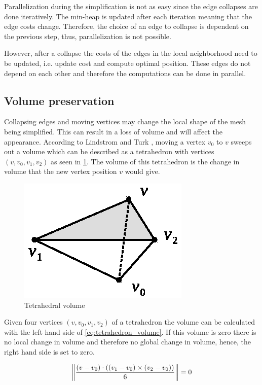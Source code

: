 Parallelization during the simplification is not as easy since the edge collapses are done iteratively. The min-heap is updated after each iteration meaning that the edge costs change. Therefore, the choice of an edge to collapse is dependent on the previous step, thus, parallelization is not possible.

However, after a collapse the costs of the edges in the local neighborhood need to be updated, i.e. update cost and compute optimal position. These edges do not depend on each other and therefore the computations can be done in parallel.

\subsection{Volume preservation} \label{sec:volume_preservation}
Collapsing edges and moving vertices may change the local shape of the mesh being simplified. This can result in a loss of volume and will affect the appearance. According to Lindstrom and Turk \cite{lindstrom1998fast} , moving a vertex $v_0$ to $v$ sweeps out a volume which can be described as a tetrahedron with vertices $(v, v_0, v_1, v_2)$ as seen in \cref{fig:tetrahedron}. The volume of this tetrahedron is the change in volume that the new vertex position $v$ would give. 

\begin{figure}[h]
    \centering
    \includegraphics[width=.5\textwidth]{figures/tetrahedron.eps}
    \caption{Tetrahedral volume}
    \label{fig:tetrahedron}
\end{figure}

Given four vertices $(v, v_0, v_1, v_2)$ of a tetrahedron the volume can be calculated with the left hand side of \cref{eq:tetrahedron_volume}. If this volume is zero there is no local change in volume and therefore no global change in volume, hence, the right hand side is set to zero.

\begin{equation} \label{eq:tetrahedron_volume}
\norm*{\frac{(v - v_0) \cdot ((v_1-v_0) \times (v_2 - v_0))}{6}} = 0
\end{equation}

